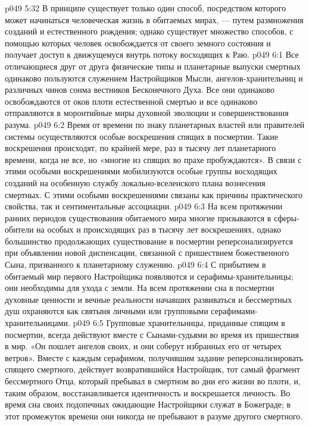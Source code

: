 \vs p049 5:32 \pc {}\bibnobreakspace {} В принципе существует только один способ, посредством которого может начинаться человеческая жизнь в обитаемых мирах, --- путем размножения созданий и естественного рождения; однако существует множество способов, с помощью которых человек освобождается от своего земного состояния и получает доступ к движущемуся внутрь потоку восходящих к Раю.
\vs p049 6:1 Все отличающиеся друг от друга физические типы и планетарные выпуски смертных одинаково пользуются служением Настройщиков Мысли, ангелов\hyp{}хранительниц и различных чинов сонма вестников Бесконечного Духа. Все они одинаково освобождаются от оков плоти естественной смертью и все одинаково отправляются в моронтийные миры духовной эволюции и совершенствования разума.
\vs p049 6:2 Время от времени по знаку планетарных властей или правителей системы осуществляются особые воскрешения спящих в посмертии. Такие воскрешения происходят, по крайней мере, раз в тысячу лет планетарного времени, когда не все, но «многие из спящих во прахе пробуждаются». В связи с этими особыми воскрешениями мобилизуются особые группы восходящих созданий на особенную службу локально\hyp{}вселенского плана вознесения смертных. С этими особыми воскрешениями связаны как причины практического свойства, так и сентиментальные ассоциации.
\vs p049 6:3 На всем протяжении ранних периодов существования обитаемого мира многие призываются в сферы\hyp{}обители на особых и происходящих раз в тысячу лет воскрешениях, однако большинство продолжающих существование в посмертии реперсонализируется при объявлении новой диспенсации, связанной с пришествием божественного Сына, призванного к планетарному служению.
\vs p049 6:4 \pc {}\bibnobreakspace {} С прибытием в обитаемый мир первого Настройщика появляются и серафимы\hyp{}хранительницы; они необходимы для ухода с земли. На всем протяжении сна в посмертии духовные ценности и вечные реальности начавших развиваться и бессмертных душ охраняются как святыня личными или групповыми серафимами\hyp{}хранительницами.
\vs p049 6:5 Групповые хранительницы, приданные спящим в посмертии, всегда действуют вместе с Сынами\hyp{}судьями во время их пришествия в мир. «Он пошлет ангелов своих, и они соберут избранных его от четырех ветров». Вместе с каждым серафимом, получившим задание реперсонализировать спящего смертного, действует возвратившийся Настройщик, тот самый фрагмент бессмертного Отца, который пребывал в смертном во дни его жизни во плоти, и, таким образом, восстанавливается идентичность и воскрешается личность. Во время сна своих подопечных ожидающие Настройщики служат в Божеграде; в этот промежуток времени они никогда не пребывают в разуме другого смертного.
